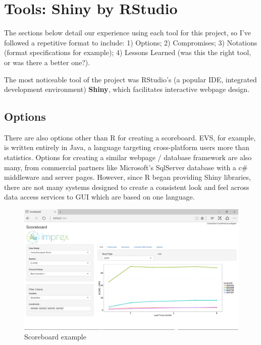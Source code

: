 \documentclass[logos,parttoc,morelanguage=french,morelanguage=german,draft]{orsay-memoire}
\begin{document}
\section{Tools: Shiny by RStudio}

The sections below detail our experience using each tool for this project, so I've followed a repetitive format to include: 1) Options; 2) Compromises; 3) Notations (format specifications for example); 4) Lessons Learned (was this the right tool, or was there a better one?).

The most noticeable tool of the project was RStudio's (a popular IDE, integrated development environment) \textbf{Shiny}, which facilitates interactive webpage design.

\subsection{Options}

There are also options other than R for creating a scoreboard. EVS, for example, is written entirely in Java, a language targeting cross-platform users more than statistics. Options for creating a similar webpage / database framework are also many, from commercial partners like Microsoft's SqlServer database with a c\# middleware and server pages. However, since R began providing Shiny libraries, there are not many systems designed to create a consistent look and feel across data access services to GUI which are based on one language.


\begin{figure}[ht]
\centering
\includegraphics[width=\linewidth]{images/shinPlotCRPS.png}
  \caption{Scoreboard example}
  \label{fig:scoreboard example}
\end{figure}
\end{document}
